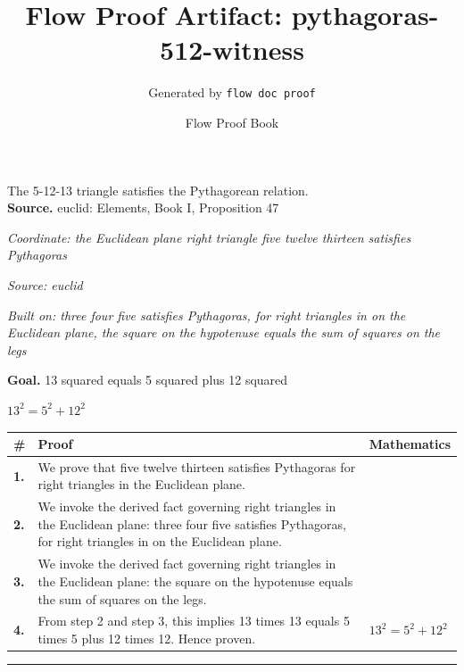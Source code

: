 \documentclass[11pt]{article}
\title{Flow Proof Artifact: pythagoras-512-witness}
\author{Generated by \texttt{flow doc proof}}
\date{Flow Proof Book}
\theoremstyle{definition}
\begin{document}
\maketitle
The 5-12-13 triangle satisfies the Pythagorean relation.\\[0.5em]
\textbf{Source.} euclid: Elements, Book I, Proposition 47\\[0.5em]
\bigskip
{}\par
\smallskip\noindent\textit{Coordinate: the Euclidean plane \cdot right triangle \cdot five twelve thirteen satisfies Pythagoras}\par
\smallskip\noindent\textit{Source: euclid}\par
\smallskip\noindent\textit{Built on: three four five satisfies Pythagoras, for right triangles in on the Euclidean plane, the square on the hypotenuse equals the sum of squares on the legs}\par
\medskip
\noindent\textbf{Goal.} 13 squared equals 5 squared plus 12 squared\par
\noindent$\displaystyle 13^{2} = 5^{2} + 12^{2}$\par
\medskip
\noindent
\begin{tabular}{@{} >{\raggedright\arraybackslash}p{} >{\raggedright\arraybackslash}p{} >{\raggedleft\arraybackslash}p{} @{}}
\textbf{\#} & \textbf{Proof} & \textbf{Mathematics} \\
\midrule
\textbf{1.} & We prove that five twelve thirteen satisfies Pythagoras for right triangles in the Euclidean plane. & \\[0.45em]
\textbf{2.} & We invoke the derived fact governing right triangles in the Euclidean plane: three four five satisfies Pythagoras, for right triangles in on the Euclidean plane. & \\[0.45em]
\textbf{3.} & We invoke the derived fact governing right triangles in the Euclidean plane: the square on the hypotenuse equals the sum of squares on the legs. & \\[0.45em]
\textbf{4.} & From step 2 and step 3, this implies 13 times 13 equals 5 times 5 plus 12 times 12. Hence proven. & $\displaystyle 13^{2} = 5^{2} + 12^{2}$ \\[0.45em]
\bottomrule
\end{tabular}
\label{thm:Geometry-right triangle-five_twelve_thirteen_satisfies_pythagoras}
\par\medskip\hrule
\end{document}
